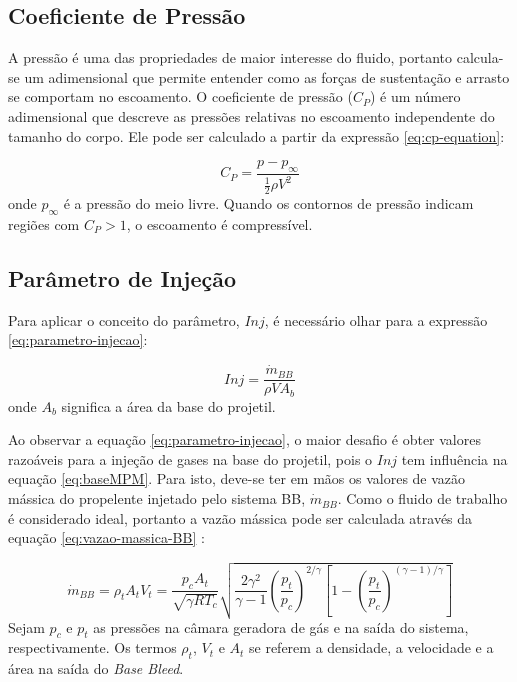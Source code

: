 \subsection{Coeficiente de Pressão}

A pressão é uma das propriedades de maior interesse do fluido, portanto calcula-se um adimensional que permite entender como as forças de sustentação e arrasto se comportam no escoamento. O coeficiente de pressão ($C_{P}$) é um número adimensional que descreve as pressões relativas no escoamento independente do tamanho do corpo. Ele pode ser calculado a partir da expressão \eqref{eq:cp-equation}: 

\begin{equation}\label{eq:cp-equation}
    C_P = \frac{p - p_{\infty}}{\frac{1}{2}\rho V^2}
\end{equation}
%
onde $p_{\infty}$ é a pressão do meio livre. Quando os contornos de pressão indicam regiões com $C_{P} > 1$, o escoamento é compressível.

\subsection{Parâmetro de Injeção}

Para aplicar o conceito do parâmetro, $Inj$, é necessário olhar para a expressão \eqref{eq:parametro-injecao}:

\begin{equation}\label{eq:parametro-injecao}
    Inj = \frac{\Dot{m}_{BB}}{\rho VA_{b}}
\end{equation}
%
onde $A_{b}$ significa a área da base do projetil. 

Ao observar a equação \ref{eq:parametro-injecao}, o maior desafio é obter valores razoáveis para a injeção de gases na base do projetil, pois o $Inj$ tem influência na equação \ref{eq:baseMPM}. Para isto, deve-se ter em mãos os valores de vazão mássica do propelente injetado pelo sistema BB, $\Dot{m}_{BB}$. Como o fluido de trabalho é considerado ideal, portanto a vazão mássica pode ser calculada através da equação \ref{eq:vazao-massica-BB} \cite{Gil2020}:

\begin{equation}\label{eq:vazao-massica-BB}
    \Dot{m}_{BB} = \rho_{t}A_{t}V_{t} = \frac{p_{c}A_{t}}{\sqrt{\gamma RT_{c}}}\sqrt{\frac{2\gamma^{2}}{\gamma - 1}\left(\frac{p_{t}}{p_{c}}\right)^{2/\gamma}\left[1-\left(\frac{p_{t}}{p_{c}}\right)^{(\gamma-1)/\gamma}\right]}
\end{equation}
%
Sejam $p_{c}$ e $p_{t}$ as pressões na câmara geradora de gás e na saída do sistema, respectivamente. Os termos $\rho_{t}$, $V_{t}$ e $A_{t}$ se referem a densidade, a velocidade e a área na saída do \textit{Base Bleed}. 

